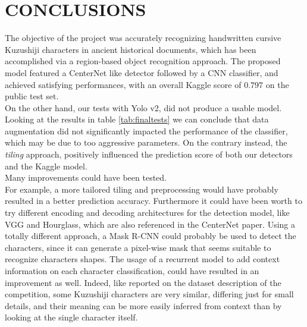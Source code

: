 \section{CONCLUSIONS}
\label{sec:conclusions}

The objective of the project was accurately recognizing handwritten cursive Kuzushiji characters in ancient historical documents, which has been accomplished via a region-based object recognition approach. The proposed model featured a CenterNet like detector followed by a CNN classifier, and achieved satisfying performances, with an overall Kaggle score of $0.797$ on the public test set.\\
On the other hand, our tests with Yolo v2, did not produce a usable model. Looking at the results in table \ref{tab:finaltests} we can conclude that data augmentation did not significantly impacted the performance of the classifier, which may be due to too aggressive parameters. On the contrary instead, the \textit{tiling} approach, positively influenced the prediction score of both our detectors and the Kaggle model. \\

Many improvements could have been tested.\\ For example, a more tailored tiling and preprocessing would have probably resulted in a better prediction accuracy. Furthermore it could have been worth to try different encoding and decoding architectures for the detection model, like VGG and Hourglass, which are also referenced in the CenterNet paper. Using a totally different approach, a Mask R-CNN could probably be used to detect the characters, since it can generate a pixel-wise mask that seems suitable to recognize characters shapes. The usage of a recurrent model to add context information on each character classification, could have resulted in an improvement as well. Indeed, like reported on the dataset description of the competition, some Kuzushiji characters are very similar, differing just for small details, and their meaning can be more easily inferred from context than by looking at the single character itself.
